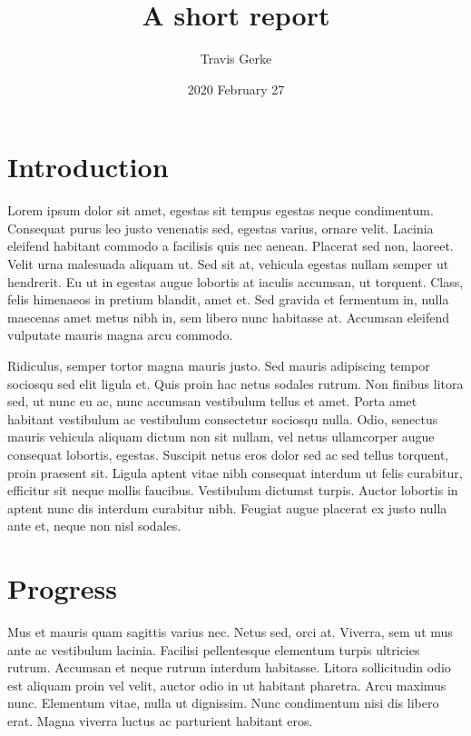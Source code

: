 \documentclass[]{article}
\title{A short report}
\author{Travis Gerke}
\date{2020 February 27}
\makeatletter
\renewcommand{\maketitle}{\bgroup\vspace*{-1cm}\setlength{\parindent}{0pt}
\begin{flushleft}
  \@author

  \@date

\end{flushleft}\egroup
}
\makeatother
\begin{document}
\maketitle

\hypertarget{introduction}{%
\section{Introduction}\label{introduction}}

Lorem ipsum dolor sit amet, egestas sit tempus egestas neque
condimentum. Consequat purus leo justo venenatis sed, egestas varius,
ornare velit. Lacinia eleifend habitant commodo a facilisis quis nec
aenean. Placerat sed non, laoreet. Velit urna malesuada aliquam ut. Sed
sit at, vehicula egestas nullam semper ut hendrerit. Eu ut in egestas
augue lobortis at iaculis accumsan, ut torquent. Class, felis himenaeos
in pretium blandit, amet et. Sed gravida et fermentum in, nulla maecenas
amet metus nibh in, sem libero nunc habitasse at. Accumsan eleifend
vulputate mauris magna arcu commodo.

Ridiculus, semper tortor magna mauris justo. Sed mauris adipiscing
tempor sociosqu sed elit ligula et. Quis proin hac netus sodales rutrum.
Non finibus litora sed, ut nunc eu ac, nunc accumsan vestibulum tellus
et amet. Porta amet habitant vestibulum ac vestibulum consectetur
sociosqu nulla. Odio, senectus mauris vehicula aliquam dictum non sit
nullam, vel netus ullamcorper augue consequat lobortis, egestas.
Suscipit netus eros dolor sed ac sed tellus torquent, proin praesent
sit. Ligula aptent vitae nibh consequat interdum ut felis curabitur,
efficitur sit neque mollis faucibus. Vestibulum dictumst turpis. Auctor
lobortis in aptent nunc dis interdum curabitur nibh. Feugiat augue
placerat ex justo nulla ante et, neque non nisl sodales.

\hypertarget{progress}{%
\section{Progress}\label{progress}}

Mus et mauris quam sagittis varius nec. Netus sed, orci at. Viverra, sem
ut mus ante ac vestibulum lacinia. Facilisi pellentesque elementum
turpis ultricies rutrum. Accumsan et neque rutrum interdum habitasse.
Litora sollicitudin odio est aliquam proin vel velit, auctor odio in ut
habitant pharetra. Arcu maximus nunc. Elementum vitae, nulla ut
dignissim. Nunc condimentum nisi dis libero erat. Magna viverra luctus
ac parturient habitant eros.
\end{document}
